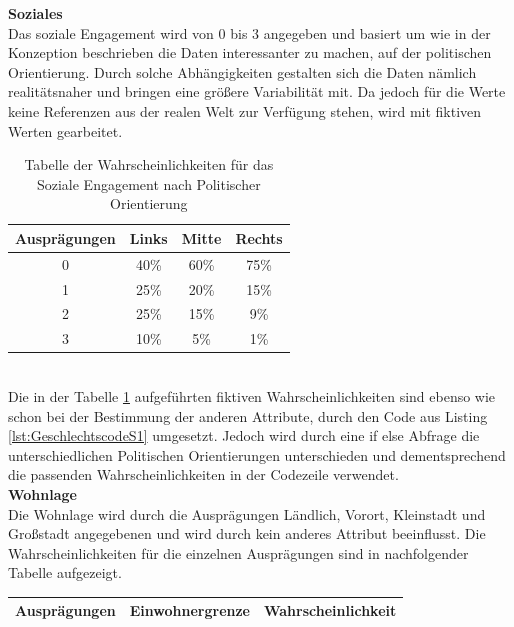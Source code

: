 \begin{onehalfspace}
\textbf{Soziales}\\
Das soziale Engagement wird von 0 bis 3 angegeben und basiert um wie in der Konzeption beschrieben die Daten interessanter zu machen, auf der politischen Orientierung. Durch solche Abhängigkeiten gestalten sich die Daten nämlich realitätsnaher und bringen eine größere Variabilität mit. Da jedoch für die Werte keine Referenzen aus der realen Welt zur Verfügung stehen, wird mit fiktiven Werten gearbeitet.\\
\begin{table}[!h]
    \centering
    \begin{tabular}{|c|c|c|c|}
    \hline
    \textbf{Ausprägungen} & \textbf{Links} & \textbf{Mitte} & \textbf{Rechts} \\ \hline
    0                     & 40\%           & 60\%           & 75\%            \\ \hline
    1                     & 25\%           & 20\%           & 15\%            \\ \hline
    2                     & 25\%           & 15\%           & 9\%             \\ \hline
    3                     & 10\%           & 5\%            & 1\%             \\ \hline
    \end{tabular}
    \caption{Tabelle der Wahrscheinlichkeiten für das Soziale Engagement nach Politischer Orientierung}
    \label{table:9}
\end{table}\\
Die in der Tabelle \ref{table:9} aufgeführten fiktiven Wahrscheinlichkeiten sind ebenso wie schon bei der Bestimmung der anderen Attribute, durch den Code aus Listing \ref{lst:GeschlechtscodeS1} umgesetzt. Jedoch wird durch eine if else Abfrage die unterschiedlichen Politischen Orientierungen unterschieden und dementsprechend die passenden Wahrscheinlichkeiten in der Codezeile verwendet.\\
\textbf{Wohnlage}\\
Die Wohnlage wird durch die Ausprägungen Ländlich, Vorort, Kleinstadt und Großstadt angegebenen und wird durch kein anderes Attribut beeinflusst. Die Wahrscheinlichkeiten für die einzelnen Ausprägungen sind in nachfolgender Tabelle aufgezeigt.
\begin{table}[!h]
    \centering
    \begin{tabular}{|c|c|c|}
    \hline
    \textbf{Ausprägungen} & \textbf{Einwohnergrenze} & \textbf{Wahrscheinlichkeit} \\ \hline

\end{tabular}
\end{table}
\end{onehalfspace}

